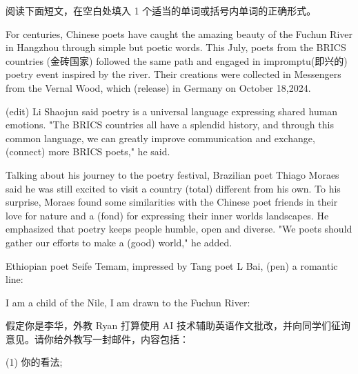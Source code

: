 \documentclass{英语试卷}
\begin{document}
\par 阅读下面短文，在空白处填入 1 个适当的单词或括号内单词的正确形式。\par
\par For centuries, Chinese poets have caught the amazing beauty of the Fuchun River in Hangzhou through simple but poetic words. This July, poets from the BRICS countries (金砖国家) followed the same path and engaged in  impromptu(即兴的) poetry event inspired by the river. Their creations were collected in Messengers from the Vernal Wood, which  (release) in Germany on October 18,2024.\par
\par {} (edit) Li Shaojun said poetry is a universal language expressing shared human emotions. "The BRICS countries all have a splendid history, and through this common language, we can greatly improve communication and exchange,  (connect) more BRICS poets," he said.\par
\par Talking about his journey to the poetry festival, Brazilian poet Thiago Moraes said he was still excited to visit a country  (total) different from his own. To his surprise, Moraes found some similarities with the Chinese poet friends in their love for nature and a  (fond) for expressing their inner worlds  landscapes. He emphasized that poetry keeps people humble, open and diverse. "We poets should gather our efforts to make a  (good) world," he added.\par
\par Ethiopian poet Seife Temam, impressed by Tang poet L Bai,  (pen) a romantic line:\par
\par I am a child of the Nile,  I am drawn to the Fuchun River:\par
{}
\par 假定你是李华，外教 Ryan 打算使用 AI 技术辅助英语作文批改，并向同学们征询意见。请你给外教写一封邮件，内容包括：\par
\par (1) 你的看法;\par
\end{document}
